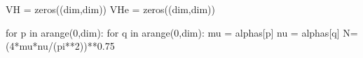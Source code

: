 \documentclass[
  letterpaper,
  DIV=11,
  numbers=noendperiod]{scrreprt}
\newenvironment{Shaded}{\begin{snugshade}}{\end{snugshade}}
\newcommand{\ControlFlowTok}[1]{\textcolor[rgb]{0.00,0.23,0.31}{#1}}
\newcommand{\DecValTok}[1]{\textcolor[rgb]{0.68,0.00,0.00}{#1}}
\newcommand{\FloatTok}[1]{\textcolor[rgb]{0.68,0.00,0.00}{#1}}
\newcommand{\KeywordTok}[1]{\textcolor[rgb]{0.00,0.23,0.31}{#1}}
\newcommand{\NormalTok}[1]{\textcolor[rgb]{0.00,0.23,0.31}{#1}}
\newcommand{\OperatorTok}[1]{\textcolor[rgb]{0.37,0.37,0.37}{#1}}
\begin{document}
\begin{Shaded}
\begin{Highlighting}[]
\NormalTok{VH }\OperatorTok{=}\NormalTok{ zeros((dim,dim))}
\NormalTok{VHe }\OperatorTok{=}\NormalTok{ zeros((dim,dim))}

\ControlFlowTok{for}\NormalTok{ p }\KeywordTok{in}\NormalTok{ arange(}\DecValTok{0}\NormalTok{,dim):}
    \ControlFlowTok{for}\NormalTok{ q }\KeywordTok{in}\NormalTok{ arange(}\DecValTok{0}\NormalTok{,dim):}
\NormalTok{        mu }\OperatorTok{=}\NormalTok{ alphas[p]}
\NormalTok{        nu }\OperatorTok{=}\NormalTok{ alphas[q]}
\NormalTok{        N}\OperatorTok{=}\NormalTok{(}\DecValTok{4}\OperatorTok{*}\NormalTok{mu}\OperatorTok{*}\NormalTok{nu}\OperatorTok{/}\NormalTok{(pi}\OperatorTok{**}\DecValTok{2}\NormalTok{))}\OperatorTok{**}\FloatTok{0.75}


\end{Highlighting}
\end{Shaded}
\end{document}
